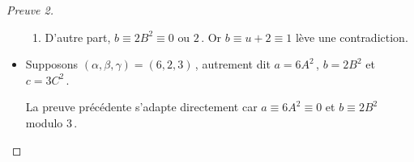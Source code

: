\begin{proof}[Preuve 2]
\begin{itemize}
\begin{enumerate}
			\item D'autre part, $b \equiv 2 B^2 \equiv \text{$0$ ou $2$}$\,.
			Or $b \equiv u + 2 \equiv 1$ lève une contradiction.
		\end{enumerate}
		
		
		\item Supposons $(\alpha, \beta, \gamma) = (6, 2, 3)$\,, 
		autrement dit 
		$a = 6 A^2$\,, $b = 2 B^2$ et $c = 3 C^2$\,.
		
		\smallskip
		\noindent
		La preuve précédente s'adapte directement car $a \equiv 6 A^2 \equiv 0$ et $b \equiv 2 B^2$ modulo $3$\,.
	\end{itemize}
\end{proof}


